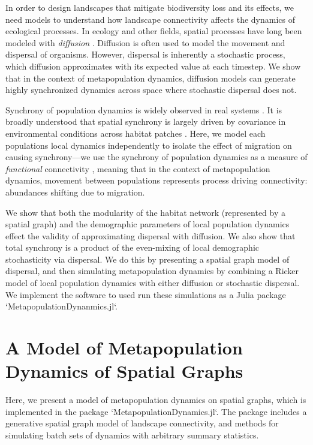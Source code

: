 \documentclass[]{article}
\begin{document}
In order to design landscapes that mitigate biodiversity loss and its effects, we need models to understand how landscape connectivity affects the dynamics of ecological processes. In ecology and other fields, spatial processes have long been modeled with \textit{diffusion} \cite{cantrell_spatial_2004, okubo_diffusion_2001, hastings_global_1978}.
Diffusion is often used to model the movement and dispersal of organisms. However, dispersal is inherently a stochastic process, which diffusion approximates with its expected value at each timestep. We show that in the context of metapopulation dynamics, diffusion models can generate highly synchronized dynamics across space where stochastic dispersal does not.

Synchrony of population dynamics is widely observed in real systems \cite{}. It is broadly understood that spatial synchrony is largely driven by covariance in environmental conditions across habitat patches \cite{}. Here, we model each populations local dynamics independently to isolate the effect of migration on causing synchrony---we use the synchrony of population dynamics as a measure of \textit{functional} connectivity \cite{}, meaning that in the context of metapopulation dynamics, movement between populations represents process driving connectivity: abundances shifting due to migration. 

We show that both the modularity of the habitat network (represented by a spatial graph) and the demographic parameters of local population dynamics effect the validity of approximating dispersal with diffusion. We also show that total synchrony is a product of the even-mixing of local demographic stochasticity via dispersal. We do this by presenting a spatial graph model of dispersal, and then simulating metapopulation dynamics by combining a Ricker model of local population dynamics with either diffusion or stochastic dispersal. 
We implement the software to used run these simulations as a Julia package `MetapopulationDynanmics.jl`.

\section{A Model of Metapopulation Dynamics of Spatial Graphs}

Here, we present a model of metapopulation dynamics on spatial graphs, which is implemented in the package `MetapopulationDynamics.jl`. 
The package includes a generative spatial graph model of landscape connectivity, and methods for simulating batch sets of dynamics with arbitrary summary statistics. 
\end{document}

